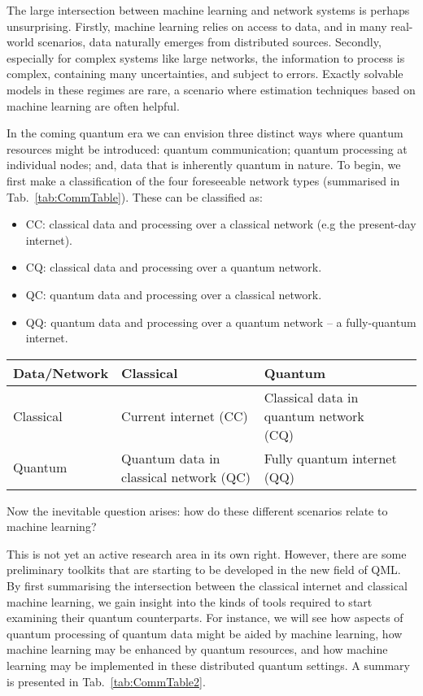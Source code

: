 The large intersection between machine learning and network systems is perhaps unsurprising. Firstly, machine learning relies on access to data, and in many real-world scenarios, data naturally emerges from distributed sources. Secondly, especially for complex systems like large networks, the information to process is complex, containing many uncertainties, and subject to errors. Exactly solvable models in these regimes are rare, a scenario where estimation techniques based on machine learning are often helpful.

In the coming quantum era we can envision three distinct ways where quantum resources might be introduced: quantum communication; quantum processing at individual nodes; and, data that is inherently quantum in nature. To begin, we first make a classification of the four foreseeable network types (summarised in Tab.~\ref{tab:CommTable}). These can be classified as:

\begin{itemize}
\item CC: classical data and processing over a classical network (e.g the present-day internet).
\item CQ: classical data and processing over a quantum network.
\item QC: quantum data and processing over a classical network.
\item QQ: quantum data and processing over a quantum network -- a fully-quantum internet.
\end{itemize}

\startnormtable
\begin{table*}[htbp!]
\begin{tabular}{|l|l|l|l|}
\hline
Data/Network & Classical & Quantum \\
\hline
\hline
Classical & Current internet (CC) & Classical data in quantum network (CQ) \\
Quantum & Quantum data in classical network (QC) & Fully quantum internet (QQ)\\
\hline
\end{tabular}
\captionspacetab \caption{\label{tab:CommTable}Classical and quantum data in a network.}
\end{table*}

Now the inevitable question arises: how do these different scenarios relate to machine learning?

This is not yet an active research area in its own right. However, there are some preliminary toolkits that are starting to be developed in the new field of QML. By first summarising the intersection between the classical internet and classical machine learning, we gain insight into the kinds of tools required to start examining their quantum counterparts. For instance, we will see how aspects of quantum processing of quantum data might be aided by machine learning, how machine learning may be enhanced by quantum resources, and how machine learning may be implemented in these distributed quantum settings. A summary is presented in Tab.~\ref{tab:CommTable2}. 

